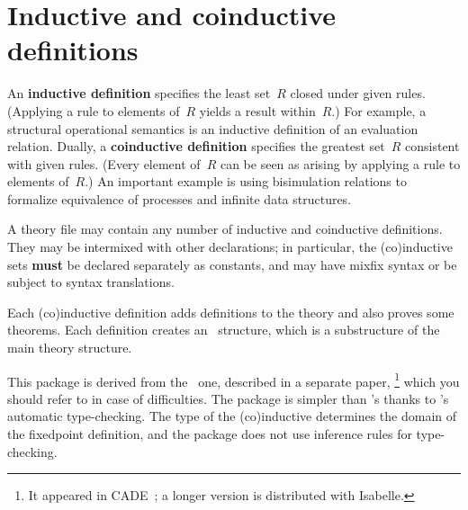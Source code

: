 \section{Inductive and coinductive definitions}

An {\bf inductive definition} specifies the least set~$R$ closed under given
rules.  (Applying a rule to elements of~$R$ yields a result within~$R$.)  For
example, a structural operational semantics is an inductive definition of an
evaluation relation.  Dually, a {\bf coinductive definition} specifies the
greatest set~$R$ consistent with given rules.  (Every element of~$R$ can be
seen as arising by applying a rule to elements of~$R$.)  An important example
is using bisimulation relations to formalize equivalence of processes and
infinite data structures.

A theory file may contain any number of inductive and coinductive
definitions.  They may be intermixed with other declarations; in
particular, the (co)inductive sets {\bf must} be declared separately as
constants, and may have mixfix syntax or be subject to syntax translations.

Each (co)inductive definition adds definitions to the theory and also
proves some theorems.  Each definition creates an \ML\ structure, which is a
substructure of the main theory structure.

This package is derived from the \ZF\ one, described in a separate
paper,%
\footnote{It appeared in CADE~\cite{paulson-CADE}; a longer version is
  distributed with Isabelle.}  %
which you should refer to in case of difficulties.  The package is simpler
than \ZF's thanks to \HOL's automatic type-checking.  The type of the
(co)inductive determines the domain of the fixedpoint definition, and the
package does not use inference rules for type-checking.


